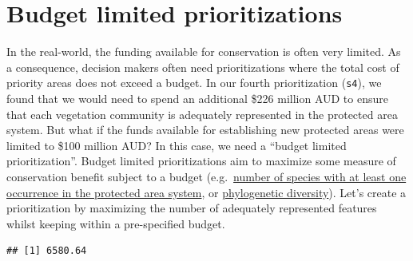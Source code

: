 \documentclass[
  12pt,
]{book}
\newenvironment{Shaded}{\begin{snugshade}}{\end{snugshade}}
\newcommand{\CommentTok}[1]{\textcolor[rgb]{0.56,0.35,0.01}{\textit{#1}}}
\newcommand{\DecValTok}[1]{\textcolor[rgb]{0.00,0.00,0.81}{#1}}
\newcommand{\FunctionTok}[1]{\textcolor[rgb]{0.00,0.00,0.00}{#1}}
\newcommand{\NormalTok}[1]{#1}
\newcommand{\OtherTok}[1]{\textcolor[rgb]{0.56,0.35,0.01}{#1}}
\newcommand{\SpecialCharTok}[1]{\textcolor[rgb]{0.00,0.00,0.00}{#1}}
\begin{document}
\clearpage

\hypertarget{budget-limited-prioritizations}{%
\section{Budget limited prioritizations}\label{budget-limited-prioritizations}}

In the real-world, the funding available for conservation is often very limited. As a consequence, decision makers often need prioritizations where the total cost of priority areas does not exceed a budget. In our fourth prioritization (\texttt{s4}), we found that we would need to spend an additional \$226 million AUD to ensure that each vegetation community is adequately represented in the protected area system. But what if the funds available for establishing new protected areas were limited to \$100 million AUD? In this case, we need a ``budget limited prioritization''. Budget limited prioritizations aim to maximize some measure of conservation benefit subject to a budget (e.g.~\href{https://prioritizr.net/reference/add_max_cover_objective.html}{number of species with at least one occurrence in the protected area system}, or \href{https://prioritizr.net/reference/add_max_phylo_div_objective.html}{phylogenetic diversity}). Let's create a prioritization by maximizing the number of adequately represented features whilst keeping within a pre-specified budget.

\begin{Shaded}
\end{Shaded}

\begin{verbatim}
## [1] 6580.64
\end{verbatim}
\end{document}
